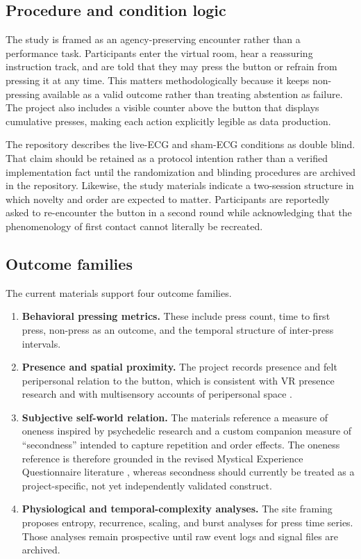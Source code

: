 \subsection{Procedure and condition logic}

The study is framed as an agency-preserving encounter rather than a performance task. Participants enter the virtual room, hear a reassuring instruction track, and are told that they may press the button or refrain from pressing it at any time. This matters methodologically because it keeps non-pressing available as a valid outcome rather than treating abstention as failure. The project also includes a visible counter above the button that displays cumulative presses, making each action explicitly legible as data production.

The repository describes the live-ECG and sham-ECG conditions as double blind. That claim should be retained as a protocol intention rather than a verified implementation fact until the randomization and blinding procedures are archived in the repository. Likewise, the study materials indicate a two-session structure in which novelty and order are expected to matter. Participants are reportedly asked to re-encounter the button in a second round while acknowledging that the phenomenology of first contact cannot literally be recreated.

\subsection{Outcome families}

The current materials support four outcome families.

\begin{enumerate}
\item \textbf{Behavioral pressing metrics.} These include press count, time to first press, non-press as an outcome, and the temporal structure of inter-press intervals.
\item \textbf{Presence and spatial proximity.} The project records presence and felt peripersonal relation to the button, which is consistent with VR presence research and with multisensory accounts of peripersonal space \citep{CummingsBailenson2016,Serino2019,SerinoEtAl2018}.
\item \textbf{Subjective self-world relation.} The materials reference a measure of oneness inspired by psychedelic research and a custom companion measure of ``secondness'' intended to capture repetition and order effects. The oneness reference is therefore grounded in the revised Mystical Experience Questionnaire literature \citep{BarrettEtAl2015}, whereas secondness should currently be treated as a project-specific, not yet independently validated construct.
\item \textbf{Physiological and temporal-complexity analyses.} The site framing proposes entropy, recurrence, scaling, and burst analyses for press time series. Those analyses remain prospective until raw event logs and signal files are archived.
\end{enumerate}


